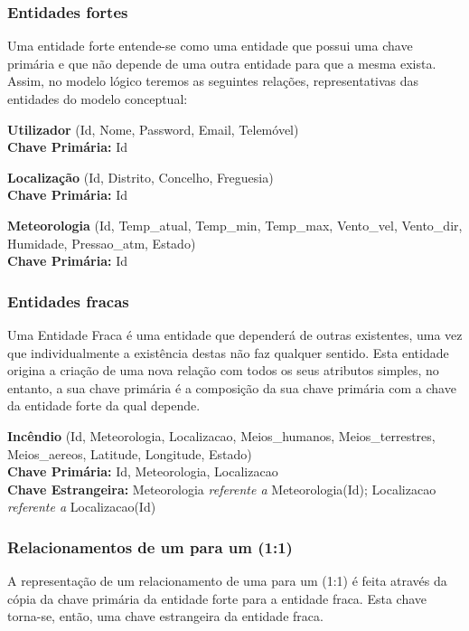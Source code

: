 \documentclass[a4paper,12pt]{scrreprt}
\begin{document}
\subsubsection{Entidades fortes}

Uma entidade forte entende-se como uma entidade que possui uma chave primária e que não depende de uma outra entidade para que a mesma exista. Assim, no modelo lógico teremos as seguintes relações, representativas das entidades do modelo conceptual:

\textbf{Utilizador} (Id, Nome, Password, Email, Telemóvel) \\
\textbf{Chave Primária:} Id

\textbf{Localização} (Id, Distrito, Concelho, Freguesia) \\
\textbf{Chave Primária:} Id

\textbf{Meteorologia} (Id, Temp\_atual, Temp\_min, Temp\_max, Vento\_vel, Vento\_dir, Humidade, Pressao\_atm, Estado) \\
\textbf{Chave Primária:} Id

\subsubsection{Entidades fracas}

Uma Entidade Fraca é uma entidade que dependerá de outras existentes, uma vez que individualmente a existência destas não faz qualquer sentido. Esta entidade origina a criação de uma nova relação com todos os seus atributos simples, no entanto, a sua chave primária é a composição da sua chave primária com a chave da entidade forte da qual depende.

\textbf{Incêndio} (Id, Meteorologia, Localizacao, Meios\_humanos, Meios\_terrestres, Meios\_aereos, Latitude, Longitude, Estado) \\
\textbf{Chave Primária:} Id, Meteorologia, Localizacao \\
\textbf{Chave Estrangeira:} Meteorologia \textit{referente a} Meteorologia(Id); Localizacao \textit{referente a} Localizacao(Id)

\subsubsection{Relacionamentos de um para um (1:1)}

A representação de um relacionamento de uma para um (1:1) é feita através da cópia da chave primária da entidade forte para a entidade fraca. Esta chave torna-se, então, uma chave estrangeira da entidade fraca.
\end{document}
